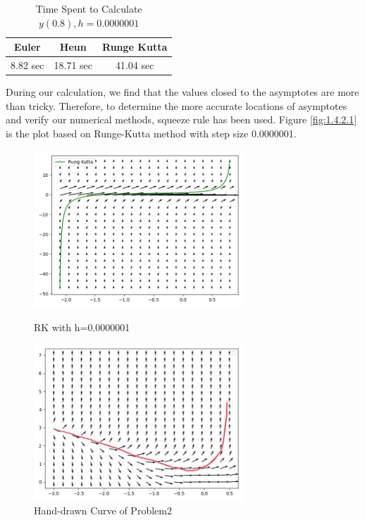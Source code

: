 \documentclass[11pt,a4paper]{article}
\begin{document}
\begin{table}[H]
	\begin{center}
		\small
		\begin{tabular}{c|c|c}
			\renewcommand{\multirowsetup}{\centering}
			Euler			&Heun			&Runge Kutta	\\ \hline
			8.82 sec		&18.71 sec		&41.04 sec		\\
		\end{tabular}
		\setlength{\abovecaptionskip}{0.1cm}
		\setlength{\belowcaptionskip}{-0.9cm}
		\caption{Time Spent to Calculate $y(0.8), h = 0.0000001$} \label{tab:tab1.4.2.1}
	\end{center}
\end{table}

During our calculation, we find that the values closed to the asymptotes are more than tricky. Therefore, to determine the more accurate locations of asymptotes and verify our numerical methods, squeeze rule has been used. Figure \ref{fig:1.4.2.1} is the plot based on Runge-Kutta method with step size 0.0000001.

\begin{center}
	\begin{figure}[H]
		\centering
		\begin{minipage}[b]{0.4\textwidth}
			\centering
			\includegraphics[width=0.7\textwidth]{P1FinalSolution.png}
			\caption{RK with h=0.0000001}
			\label{fig:1.4.2.1}
		\end{minipage}
		\begin{minipage}[b]{0.4\textwidth}
			\centering
			\includegraphics[width=0.7\textwidth]{Problem2HandSketch.jpeg}
			\caption{Hand-drawn Curve of Problem2}
			\label{fig:2.0.1}
		\end{minipage}

	\end{figure}
\end{center}
\end{document}
